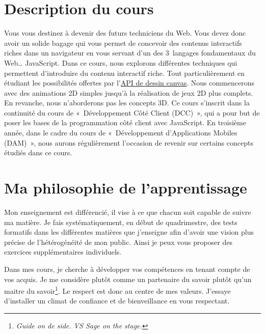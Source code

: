 \section{Description du cours}

Vous vous destinez à devenir des futurs techniciens du Web. Vous devez donc avoir un solide bagage qui vous permet de concevoir des contenus interactifs riches dans un navigateur en vous servant d’un des 3~langages fondamentaux du Web… JavaScript. Dans ce cours, nous explorons différentes techniques qui permettent d’introduire du contenu interactif riche. Tout particulièrement en étudiant les possibilités offertes par l’\href{https://developer.mozilla.org/fr/docs/Web/API/Canvas_API}{API de dessin canvas}. Nous commencerons avec des animations 2D simples jusqu’à la réalisation de jeux 2D plus complets. En revanche, nous n’aborderons pas les concepts 3D.
Ce cours s’inscrit dans la continuité du cours de «~Développement Côté Client (DCC)~», qui a pour but de poser les bases de la programmation côté client avec JavaScript. En troisième année, dans le cadre du cours de «~Développement d'Applications Mobiles (DAM)~», nous aurons régulièrement l’occasion de revenir sur certains concepts étudiés dans ce cours.
\clearpage
\section{Ma philosophie de l’apprentissage}


Mon enseignement est différencié, il vise à ce que chacun soit capable de suivre ma matière. Je fais systématiquement, en début de quadrimestre, des tests formatifs dans les différentes matières que j'enseigne afin d’avoir une vision plus précise de l’hétérogénéité de mon public. Ainsi je peux vous proposer des exercices supplémentaires individuels.\cite{lawrence2004differentiated}

Dans mes cours, je cherche à développer vos compétences en tenant compte de vos acquis. Je me considère plutôt comme un partenaire du savoir plutôt qu'un maitre du savoir\footnote{\textit{Guide on de side. VS Sage on the stage.}}. Le respect est donc au centre de mes valeurs. J’essaye d’installer un climat de confiance et de bienveillance en vous respectant. %

